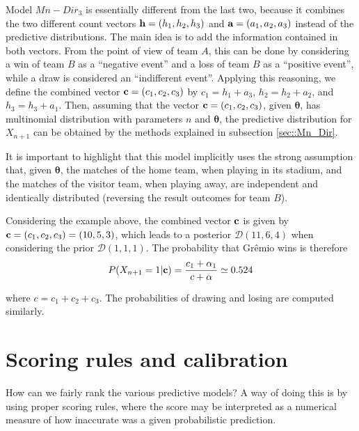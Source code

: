 \documentclass[journal,article,accept,moreauthors,pdftex,12pt,a4paper]{mdpi}
\begin{document}
	Model $Mn-Dir_3$ is essentially different from the
	last two, because it combines the two different count vectors ${\bf
		h} = (h_1, h_2, h_3)$ and ${\bf a} = (a_1, a_2, a_3)$ instead of the
	predictive distributions. The main idea is to add the information
	contained in both vectors. From the point of view of team $A$, this can
	be done by considering a win of team $B$ as a ``negative event'' and a
	loss of team $B$ as a ``positive event'', while a draw is
	considered an ``indifferent event''. Applying this reasoning,
	we define the combined vector ${\bf c} = (c_1, c_2, c_3)$ by $c_1 =
	h_1 + a_3$, $h_2 = h_2 + a_2$, and $h_3 = h_3 + a_1$. Then, assuming that the vector ${\bf c} = (c_1, c_2, c_3)$, given $\boldsymbol{\theta}$, has multinomial distribution with parameters $n$ and
	$\boldsymbol{\theta}$, the predictive distribution for $X_{n + 1}$ can
	be obtained by the methods explained in subsection
	\ref{sec::Mn_Dir}.
	
	It is important to highlight that this model implicitly uses the strong assumption that, given $\boldsymbol{\theta}$, the matches of the home team, when playing in its stadium, and the matches of the visitor team, when playing away, are independent and identically distributed (reversing the result outcomes for team $B$).
	
	Considering the example above, the combined vector ${\bf c}$ is given by ${\bf c}=(c_1,c_2,c_3)=(10,5,3)$, which leads to a posterior $\mathcal{D}(11,6,4)$ when considering the prior $\mathcal{D}(1,1,1)$.
	The probability that Gr\^emio wins is therefore	
	\[P(X_{n+1}=1|{\bf c})=\frac{c_1+\alpha_1}{c+\alpha}\simeq0.524
	\]
	
	\noindent
	where $c=c_1+c_2+c_3$. The probabilities of drawing and losing are computed similarly.
	
	\section{Scoring rules and calibration}
	\label{sec::scoring}
	
	How can we fairly rank the various predictive models?
	A way of doing this is by using proper scoring rules, where
	the score may be interpreted as a numerical measure of how inaccurate was a given probabilistic prediction.
	
\end{document}
